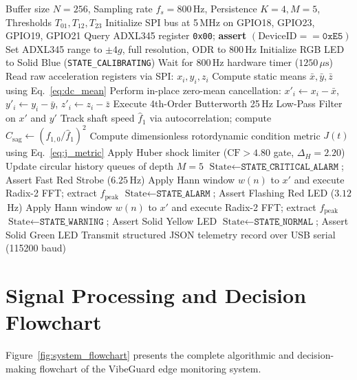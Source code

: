 \begin{algorithm}[H]
\caption{VibeGuard Real-Time Edge Vibration Processing Pipeline}
\label{alg:vibeguard_pipeline}
\begin{algorithmic}[1]
\Require Buffer size $N = 256$, Sampling rate $f_s = 800$\,Hz, Persistence $K = 4, M = 5$, Thresholds $T_{01}, T_{12}, T_{23}$
\State Initialize SPI bus at 5\,MHz on GPIO18, GPIO23, GPIO19, GPIO21
\State Query ADXL345 register \texttt{0x00}; \textbf{assert} $(\text{DeviceID} == \texttt{0xE5})$
\State Set ADXL345 range to $\pm 4g$, full resolution, ODR to 800\,Hz
\State Initialize RGB LED to Solid Blue (\texttt{STATE\_CALIBRATING})
\Loop {}
        \State Wait for 800\,Hz hardware timer ($1250\,\mu\text{s}$)
        \State Read raw acceleration registers via SPI: $x_i, y_i, z_i$
    \EndFor
    \State Compute static means $\bar{x}, \bar{y}, \bar{z}$ using Eq.~\eqref{eq:dc_mean}
    \State Perform in-place zero-mean cancellation: $x'_i \gets x_i - \bar{x}$, $y'_i \gets y_i - \bar{y}$, $z'_i \gets z_i - \bar{z}$
    \State Execute 4th-Order Butterworth 25\,Hz Low-Pass Filter on $x'$ and $y'$
    \State Track shaft speed $\hat{f}_1$ via autocorrelation; compute $C_{\mathrm{sag}} \gets (f_{1,0} / \hat{f}_1)^2$
    \State Compute dimensionless rotordynamic condition metric $J(t)$ using Eq.~\eqref{eq:j_metric}
    \State Apply Huber shock limiter ($\mathrm{CF} > 4.80$ gate, $\Delta_H = 2.20$)
    \State Update circular history queues of depth $M = 5$
        \State $\text{State} \gets \texttt{STATE\_CRITICAL\_ALARM}$; Assert Fast Red Strobe ($6.25$\,Hz)
        \State Apply Hann window $w(n)$ to $x'$ and execute Radix-2 FFT; extract $f_{\mathrm{peak}}$
        \State $\text{State} \gets \texttt{STATE\_ALARM}$; Assert Flashing Red LED ($3.12$\,Hz)
        \State Apply Hann window $w(n)$ to $x'$ and execute Radix-2 FFT; extract $f_{\mathrm{peak}}$
        \State $\text{State} \gets \texttt{STATE\_WARNING}$; Assert Solid Yellow LED
    \Else
        \State $\text{State} \gets \texttt{STATE\_NORMAL}$; Assert Solid Green LED
    \EndIf
    \State Transmit structured JSON telemetry record over USB serial (115200 baud)
\EndLoop
\end{algorithmic}
\end{algorithm}

\section{Signal Processing and Decision Flowchart}
\hspace{2em}Figure~\ref{fig:system_flowchart} presents the complete algorithmic and decision-making flowchart of the VibeGuard edge monitoring system.

